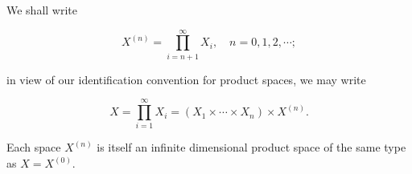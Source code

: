 We shall write

$$X^{(n)} = \prod_{i=n+1}^{\infty} X_i, \quad n = 0, 1, 2, \cdots;$$

in view of our identification convention for product spaces, we may write

$$X = \prod_{i=1}^{\infty} X_i = (X_1 \times \cdots \times X_n) \times X^{(n)}.$$

Each space $X^{(n)}$ is itself an infinite dimensional product space of the same type as $X = X^{(0)}$.
